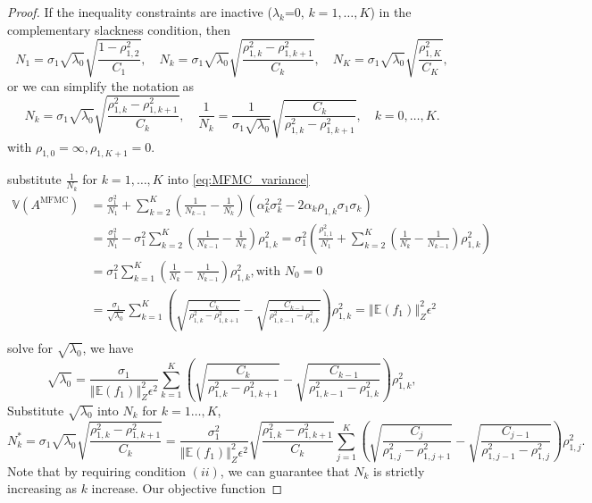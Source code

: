 \documentclass[final,3p,times,11pt]{elsarticle}
\begin{document}
\begin{proof}
If the inequality constraints are inactive ($\lambda_k$=0, $k=1,\dots, K$) in the complementary slackness condition, then 
\[
N_1 = \sigma_1\sqrt{\lambda_0}\sqrt{\frac{1-\rho_{1,2}^2}{C_1}}, \quad N_k = \sigma_1\sqrt{\lambda_0}\sqrt{\frac{\rho_{1,k}^2-\rho_{1,k+1}^2}{C_k}}, \quad N_K = \sigma_1\sqrt{\lambda_0}\sqrt{\frac{\rho_{1,K}^2}{C_K}},
\]
or we can simplify the notation as
\[
N_k = \sigma_1\sqrt{\lambda_0}\sqrt{\frac{\rho_{1,k}^2-\rho_{1,k+1}^2}{C_k}},\quad  \frac{1}{N_k} = \frac{1}{\sigma_1\sqrt{\lambda_0}}\sqrt{\frac{C_k}{\rho_{1,k}^2-\rho_{1,k+1}^2}}, \quad k=0,\ldots,K.
\]
with $\rho_{1,0}=\infty, \rho_{1,K+1}=0$.


substitute $\frac{1}{N_k}$ for $k=1,\ldots, K$ into \eqref{eq:MFMC_variance}
\begin{align*}
    \mathbb{V}\left(A^{\text{MFMC}}\right)&=\frac{\sigma_1^2}{N_1} + \sum_{k=2}^K \left(\frac{1}{N_{k-1}} - \frac{1}{N_k}\right)\left(\alpha_k^2\sigma_k^2 - 2\alpha_k\rho_{1,k}\sigma_1\sigma_k\right)\\
    &=\frac{\sigma_1^2}{N_1} - \sigma_1^2\sum_{k=2}^K \left(\frac{1}{N_{k-1}} - \frac{1}{N_k}\right)\rho_{1,k}^2 = \sigma_1^2\left(\frac{\rho_{1,1}^2}{N_1} +\sum_{k=2}^K \left( \frac{1}{N_k} - \frac{1}{N_{k-1}}\right)\rho_{1,k}^2\right)\\
    &= \sigma_1^2\sum_{k=1}^K \left( \frac{1}{N_k} - \frac{1}{N_{k-1}}\right)\rho_{1,k}^2, \text{with } N_0=0\\
    &=\frac{\sigma_1}{\sqrt{\lambda_0}}\sum_{k=1}^{K} \left(\sqrt{\frac{C_k}{\rho_{1,k}^2-\rho_{1,k+1}^2}} - \sqrt{\frac{C_{k-1}}{\rho_{1,k-1}^2-\rho_{1,k}^2}}\right)\rho_{1,k}^2 =\left\Vert\mathbb{E}(f_1) \right\Vert_{Z}^2\epsilon^2\\
\end{align*}
solve for $\sqrt{\lambda_0}$, we have 
\[
\sqrt{\lambda_0} = \frac{\sigma_1}{\left\Vert\mathbb{E}(f_1) \right\Vert_{Z}^2\epsilon^2}\sum_{k=1}^{K} \left(\sqrt{\frac{C_k}{\rho_{1,k}^2-\rho_{1,k+1}^2}} - \sqrt{\frac{C_{k-1}}{\rho_{1,k-1}^2-\rho_{1,k}^2}}\right)\rho_{1,k}^2,
\]
Substitute $\sqrt{\lambda_0}$ into $N_k$ for $k=1\ldots,K$,
\[
N_k^* = \sigma_1\sqrt{\lambda_0}\sqrt{\frac{\rho_{1,k}^2-\rho_{1,k+1}^2}{C_k}}= \frac{\sigma_1^2}{\left\Vert\mathbb{E}(f_1) \right\Vert_{Z}^2\epsilon^2}\sqrt{\frac{\rho_{1,k}^2-\rho_{1,k+1}^2}{C_k}}\sum_{j=1}^{K} \left(\sqrt{\frac{C_j}{\rho_{1,j}^2-\rho_{1,j+1}^2}} - \sqrt{\frac{C_{j-1}}{\rho_{1,j-1}^2-\rho_{1,j}^2}}\right)\rho_{1,j}^2.
\]
Note that by requiring condition $(ii)$, we can guarantee that $N_k$ is strictly increasing as $k$ increase. Our objective function


\end{proof}
\end{document}
